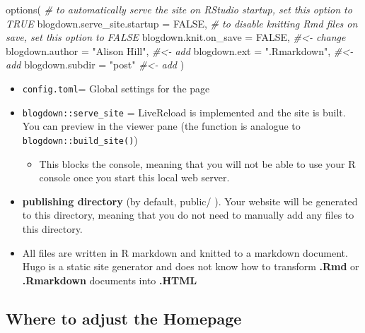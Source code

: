 \documentclass[
]{article}
\newenvironment{Shaded}{\begin{snugshade}}{\end{snugshade}}
\newcommand{\AttributeTok}[1]{\textcolor[rgb]{0.77,0.63,0.00}{#1}}
\newcommand{\CommentTok}[1]{\textcolor[rgb]{0.56,0.35,0.01}{\textit{#1}}}
\newcommand{\ConstantTok}[1]{\textcolor[rgb]{0.00,0.00,0.00}{#1}}
\newcommand{\FunctionTok}[1]{\textcolor[rgb]{0.00,0.00,0.00}{#1}}
\newcommand{\NormalTok}[1]{#1}
\newcommand{\StringTok}[1]{\textcolor[rgb]{0.31,0.60,0.02}{#1}}
\providecommand{\tightlist}{%
  \setlength{\itemsep}{0pt}\setlength{\parskip}{0pt}}
\begin{document}
\begin{Shaded}
\begin{Highlighting}[]

\FunctionTok{options}\NormalTok{(}
  \CommentTok{\# to automatically serve the site on RStudio startup, set this option to TRUE}
  \AttributeTok{blogdown.serve\_site.startup =} \ConstantTok{FALSE}\NormalTok{,}
  \CommentTok{\# to disable knitting Rmd files on save, set this option to FALSE}
  \AttributeTok{blogdown.knit.on\_save =} \ConstantTok{FALSE}\NormalTok{,     }\CommentTok{\#\textless{}{-} change}
  \AttributeTok{blogdown.author =} \StringTok{"Alison Hill"}\NormalTok{,  }\CommentTok{\#\textless{}{-} add}
  \AttributeTok{blogdown.ext =} \StringTok{".Rmarkdown"}\NormalTok{,      }\CommentTok{\#\textless{}{-} add}
  \AttributeTok{blogdown.subdir =} \StringTok{"post"}          \CommentTok{\#\textless{}{-} add}
\NormalTok{)}
\end{Highlighting}
\end{Shaded}

\begin{itemize}
\item
  \texttt{config.toml}= Global settings for the page
\item
  \texttt{blogdown::serve\_site} = LiveReload is implemented and the site is
  built. You can preview in the viewer pane (the function is analogue
  to \texttt{blogdown::build\_site()})

  \begin{itemize}
  \tightlist
  \item
    This blocks the console, meaning that you will not be able to
    use your R console once you start this local web server.
  \end{itemize}
\item
  \textbf{publishing directory} (by default, public/ ). Your website will
  be generated to this directory, meaning that you do not need to
  manually add any files to this directory.
\item
  All files are written in R markdown and knitted to a markdown
  document. Hugo is a static site generator and does not know how to
  transform \textbf{.Rmd} or \textbf{.Rmarkdown} documents into \textbf{.HTML}
\end{itemize}

\hypertarget{where-to-adjust-the-homepage-1}{%
\subsection{Where to adjust the Homepage}\label{where-to-adjust-the-homepage-1}}
\end{document}
